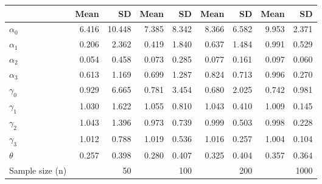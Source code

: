 
\begin{tabular}[t]{lrrrrrrrr}
\toprule
  & Mean & SD & Mean  & SD  & Mean   & SD   & Mean    & SD   \\
\midrule
$\alpha_{0}$ & 6.416 & 10.448 & 7.385 & 8.342 & 8.366 & 6.582 & 9.953 & 2.371\\
$\alpha_{1}$ & 0.206 & 2.362 & 0.419 & 1.840 & 0.637 & 1.484 & 0.991 & 0.529\\
$\alpha_{2}$ & 0.054 & 0.458 & 0.073 & 0.285 & 0.077 & 0.161 & 0.097 & 0.060\\
$\alpha_{3}$ & 0.613 & 1.169 & 0.699 & 1.287 & 0.824 & 0.713 & 0.996 & 0.270\\
$\gamma_{0}$ & 0.929 & 6.665 & 0.781 & 3.454 & 0.680 & 2.025 & 0.742 & 0.981\\
$\gamma_{1}$ & 1.030 & 1.622 & 1.055 & 0.810 & 1.043 & 0.410 & 1.009 & 0.145\\
$\gamma_{2}$ & 1.043 & 1.396 & 0.973 & 0.739 & 0.999 & 0.503 & 0.998 & 0.228\\
$\gamma_{3}$ & 1.012 & 0.788 & 1.019 & 0.536 & 1.016 & 0.257 & 1.004 & 0.104\\
$\theta$ & 0.257 & 0.398 & 0.280 & 0.407 & 0.325 & 0.404 & 0.357 & 0.364\\
Sample size (n) &  & 50 &  & 100 &  & 200 &  & 1000\\
\bottomrule
\end{tabular}
